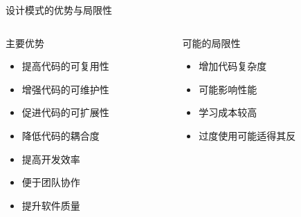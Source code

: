\documentclass[UTF8,aspectratio=169]{beamer}
\begin{document}
\begin{frame}{设计模式的优势与局限性}
    \begin{columns}
        \begin{column}{0.48\textwidth}
            \begin{ytublock}{主要优势}
                \begin{itemize}
                    \item 提高代码的可复用性
                    \item 增强代码的可维护性
                    \item 促进代码的可扩展性
                    \item 降低代码的耦合度
                    \item 提高开发效率
                    \item 便于团队协作
                    \item 提升软件质量
                \end{itemize}
            \end{ytublock}
        \end{column}
        \begin{column}{0.48\textwidth}
            \begin{alertytublock}{可能的局限性}
                \begin{itemize}
                    \item 增加代码复杂度
                    \item 可能影响性能
                    \item 学习成本较高
                    \item 过度使用可能适得其反
                \end{itemize}
            \end{alertytublock}
        \end{column}
    \end{columns}
\end{frame}
\end{document}
